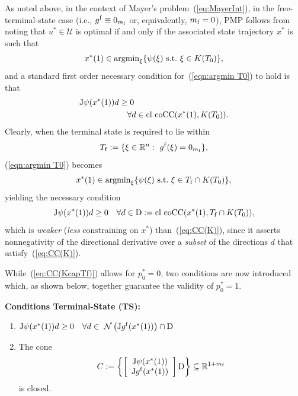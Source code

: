\documentclass[letterpaper,10pt,conference]{ieeeconf}
\def\R{{\mathbb{R}}}
\begin{document}
As noted above, %
in the context of Mayer's problem~(\ref{eq:MayerInt}),
in the free-terminal-state case 
(i.e., $g^{\rm f}\equiv0_{m_{\rm f}}$ or, equivalently, $m_{\rm f}=0$),
PMP follows from noting that $u^*\in{\mathcal U}$
is optimal if and only if the associated state trajectory $x^*$ is
such that 
\begin{equation}
\label{eqn:argmin T0}
x^*(1)\in{\rm argmin}_\xi\{\psi(\xi) {\rm ~s.t.~} \xi\in K(T_0)\},
\end{equation}
and a standard first order necessary condition for~(\ref{eqn:argmin T0})
to hold is that
\begin{equation}
\label{eq:CC(K)}
\begin{aligned}
{\rm J}\psi(x^*(1))d&\geq0\\
&\quad\forall d\in{\rm cl~coCC}(x^*(1),K(T_0)).
\end{aligned}
\end{equation}
Clearly, when the terminal state is required to lie within %
\[
T_{\rm f}:=\{\xi\in\R^n:~g^{\rm f}(\xi)=0_{m_{\rm f}}\},
\]
(\ref{eqn:argmin T0}) becomes
\[
x^*(1)\in{\rm argmin}_\xi\{\psi(\xi) {\rm ~s.t.~} \xi\in
T_{\rm f}\cap K(T_0)\},
\]
yielding the necessary condition
\begin{equation}
\label{eq:CC(KcapTf)}
{\rm J}\psi(x^*(1))d \geq 0
\quad\forall d \in {\rm D}:= {\rm cl~coCC}(x^*(1),T_{\rm f}\cap K(T_0)),
\end{equation}
which is {\em weaker} ({\em less} constraining on $x^*$) than~(\ref{eq:CC(K)}), 
since it asserts nonnegativity of the directional derivative over
a {\em subset} of the directions $d$ that satisfy~(\ref{eq:CC(K)}).

While~(\ref{eq:CC(KcapTf)}) allows for $p_0^*=0$, two conditions are now 
introduced which, as shown below, together guarantee the validity of
$p_0^*=1$.


\smallskip\noindent
{\bf Conditions Terminal-State (TS):} 
\begin{enumerate}
\item[TS1.]
${\rm J}\psi(x^*(1))d \geq 0
\quad\forall d \in ~
{\mathcal N}\left({\rm J}g^{\rm f}(x^*(1))\right)
\cap {\rm D}$  %
\item[TS2.]
The cone
\[
C := \left\{ \left[
      \begin{array}{c} {\rm J}\psi(x^*(1))  \\
                  {\rm J}g^{\rm f}(x^*(1)) 
    \end{array} \right]{\rm D}
    \right\} \subseteq\R^{1+m_{\rm f}}
\]
is closed.
\end{enumerate}
\end{document}
